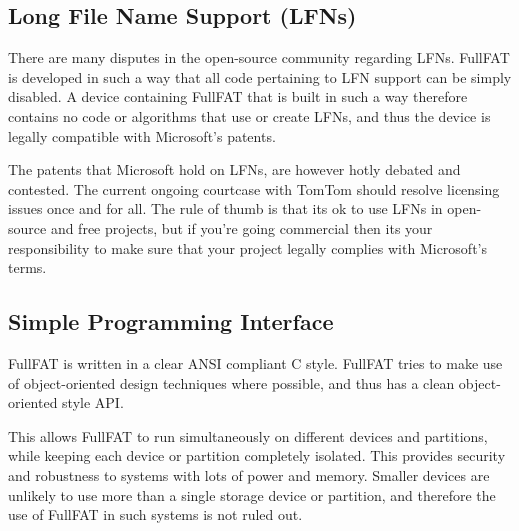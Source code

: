 \subsection{Long File Name Support (LFNs)}
There are many disputes in the open-source community regarding LFNs. FullFAT is developed in such a way that all code pertaining to LFN support can be simply disabled. A device containing FullFAT that is built in such a way therefore contains no code or algorithms that use or create LFNs, and thus the device is legally compatible with Microsoft's patents.

The patents that Microsoft hold on LFNs, are however hotly debated and contested. The current ongoing courtcase with TomTom should resolve licensing issues once and for all. The rule of thumb is that its ok to use LFNs in open-source and free projects, but if you're going commercial then its your responsibility to make sure that your project legally complies with Microsoft's terms.

\subsection{Simple Programming Interface}
FullFAT is written in a clear ANSI compliant C style. FullFAT tries to make use of object-oriented design techniques where possible, and thus has a clean object-oriented style API.

This allows FullFAT to run simultaneously on different devices and partitions, while keeping each device or partition completely isolated. This provides security and robustness to systems with lots of power and memory. Smaller devices are unlikely to use more than a single storage device or partition, and therefore the use of FullFAT in such systems is not ruled out.
